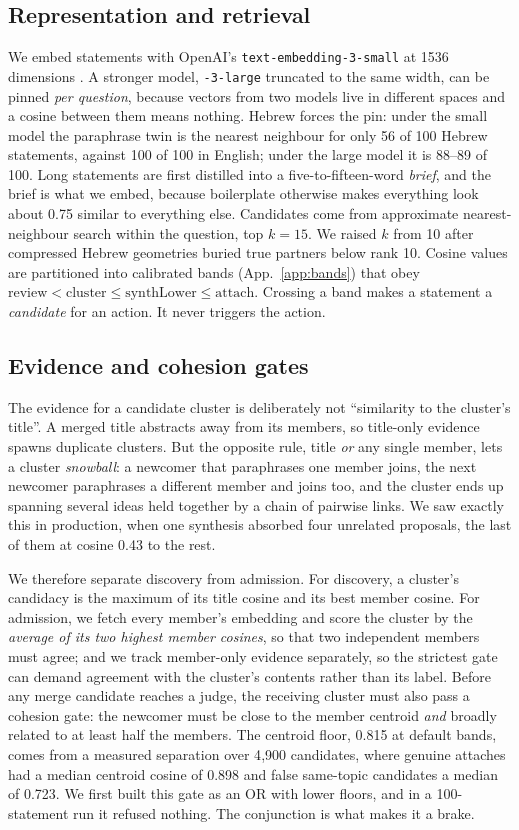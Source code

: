 \documentclass{article}
\begin{document}
\subsection{Representation and retrieval}
We embed statements with OpenAI's \texttt{text-embedding-3-small} at 1536 dimensions \citep{openai2024embeddings}. A stronger model, \texttt{-3-large} truncated to the same width, can be pinned \emph{per question}, because vectors from two models live in different spaces and a cosine between them means nothing. Hebrew forces the pin: under the small model the paraphrase twin is the nearest neighbour for only 56 of 100 Hebrew statements, against 100 of 100 in English; under the large model it is 88--89 of 100. Long statements are first distilled into a five-to-fifteen-word \emph{brief}, and the brief is what we embed, because boilerplate otherwise makes everything look about 0.75 similar to everything else. Candidates come from approximate nearest-neighbour search within the question, top $k=15$. We raised $k$ from 10 after compressed Hebrew geometries buried true partners below rank 10. Cosine values are partitioned into calibrated bands (App.~\ref{app:bands}) that obey $\text{review}<\text{cluster}\le\text{synthLower}\le\text{attach}$. Crossing a band makes a statement a \emph{candidate} for an action. It never triggers the action.

\subsection{Evidence and cohesion gates}
\label{sec:cohesion}
The evidence for a candidate cluster is deliberately not ``similarity to the cluster's title''. A merged title abstracts away from its members, so title-only evidence spawns duplicate clusters. But the opposite rule, title \emph{or} any single member, lets a cluster \emph{snowball}: a newcomer that paraphrases one member joins, the next newcomer paraphrases a different member and joins too, and the cluster ends up spanning several ideas held together by a chain of pairwise links. We saw exactly this in production, when one synthesis absorbed four unrelated proposals, the last of them at cosine 0.43 to the rest.

We therefore separate discovery from admission. For discovery, a cluster's candidacy is the maximum of its title cosine and its best member cosine. For admission, we fetch every member's embedding and score the cluster by the \emph{average of its two highest member cosines}, so that two independent members must agree; and we track member-only evidence separately, so the strictest gate can demand agreement with the cluster's contents rather than its label. Before any merge candidate reaches a judge, the receiving cluster must also pass a cohesion gate: the newcomer must be close to the member centroid \emph{and} broadly related to at least half the members. The centroid floor, 0.815 at default bands, comes from a measured separation over 4{,}900 candidates, where genuine attaches had a median centroid cosine of 0.898 and false same-topic candidates a median of 0.723. We first built this gate as an OR with lower floors, and in a 100-statement run it refused nothing. The conjunction is what makes it a brake.
\end{document}

